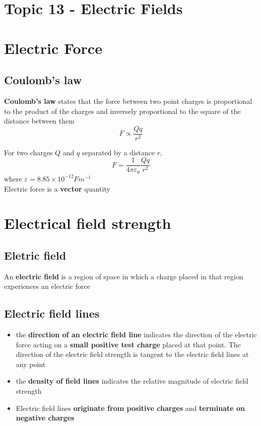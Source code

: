 \documentclass[a4paper, 10pt]{article}
\begin{document}
\section*{Topic 13 - Electric Fields}
\section{Electric Force}

\subsection{Coulomb's law}
\begin{framed}
   \textbf{Coulomb's law} states that the force between two point charges is proportional to the product of the charges and inversely proportional to the square of the distance between them
   \[
      F \propto \frac{Qq}{r^2}
   \]

   For two charges $Q$ and $q$ separated by a distance $r$,
   \[
   F = \frac{1}{4 \pi \varepsilon_0}\frac{Qq}{r^2}
   \]
   where $\varepsilon = 8.85 \times 10^{-12} Fm^{-1}$  \\
 
   Electric force is a \textbf{vector} quantity
\end{framed}	

\section{Electrical field strength}

\subsection{Eletric field}
\begin{framed}
   An \textbf{electric field} is a region of space in which a charge placed in that region experiences an electric force
\end{framed}	

\subsection{Electric field lines}
\begin{itemize}
   \item the \textbf{direction of an electric field line} indicates the direction of the electric force acting on a \textbf{small positive test charge} placed at that point. The direction of the electric field strength is tangent to the electric field lines at any point
   \item the \textbf{density of field lines} indicates the relative magnitude of electric field strength
   \item Electric field lines \textbf{originate from positive charges} and \textbf{terminate on negative charges}
\end{itemize}	
\end{document}
